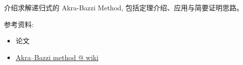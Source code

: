 \documentclass[a4paper, justified]{tufte-handout}
\begin{document}
\begin{solution}
\end{solution}

\beginoptional

\begin{problem}
\end{problem}

\begin{solution}
\end{solution}

\beginot

\begin{ot}
  介绍求解递归式的 Akra-Bazzi Method, 包括定理介绍、应用与简要证明思路。

  参考资料:
  \begin{itemize}
    \item 论文~\cite{ABMethod}
    \item \href{https://en.wikipedia.org/wiki/Akra\%E2\%80\%93Bazzi\_method}{Akra–Bazzi method @ wiki}
  \end{itemize}
\end{ot}

\vspace{0.50cm}
\begin{ot}[]
\end{ot}




\beginfb



\end{document}
